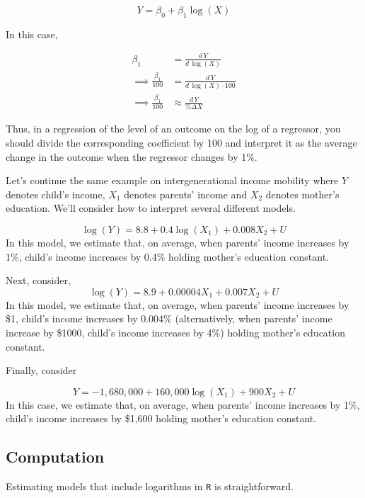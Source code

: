 \documentclass[
  letterpaper,
  DIV=11,
  numbers=noendperiod]{scrreprt}
\begin{document}
\begin{itemize}
  \[
      Y = \beta_0 + \beta_1 \log(X)
    \]

  In this case,

  \[
      \begin{aligned}
      \beta_1 &= \frac{d\, Y}{d \, \log(X)} \\
      \implies \frac{\beta_1}{100} &= \frac{d \, Y}{d \, \log(X) \cdot 100} \\
      \implies \frac{\beta_1}{100} &\approx \frac{d \, Y}{\% \Delta X}
      \end{aligned}
    \]

  Thus, in a regression of the level of an outcome on the log of a
  regressor, you should divide the corresponding coefficient by 100 and
  interpret it as the average change in the outcome when the regressor
  changes by 1\%.
\end{itemize}

Let's continue the same example on intergenerational income mobility
where \(Y\) denotes child's income, \(X_1\) denotes parents' income and
\(X_2\) denotes mother's education. We'll consider how to interpret
several different models.

\[
  \log(Y) = 8.8 + 0.4 \log(X_1) + 0.008 X_2 + U
\] In this model, we estimate that, on average, when parents' income
increases by 1\%, child's income increases by 0.4\% holding mother's
education constant.

Next, consider, \[
  \log(Y) = 8.9 + 0.00004 X_1 + 0.007 X_2 + U
\] In this model, we estimate that, on average, when parents' income
increases by \$1, child's income increases by 0.004\% (alternatively,
when parents' income increase by \$1000, child's income increases by
4\%) holding mother's education constant.

Finally, consider

\[
  Y = -1,680,000 + 160,000 \log(X_1) + 900 X_2 + U
\] In this case, we estimate that, on average, when parents' income
increases by 1\%, child's income increases by \$1,600 holding mother's
education constant.

\subsection{Computation}\label{computation-5}

Estimating models that include logarithms in \texttt{R} is
straightforward.
\end{document}
